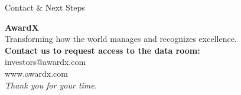 \documentclass[aspectratio=169, 10pt]{beamer}
\begin{document}
\begin{frame}{Contact \& Next Steps}
    \begin{center}
        \Huge \textbf{AwardX} \\
        \vspace{0.8cm}
        \Large \textcolor{CorporateSecondary}{Transforming how the world manages and recognizes excellence.} \\
        \vspace{1cm}
        \normalsize 
        \textbf{Contact us to request access to the data room:} \\
        \vspace{0.2cm}
        investors@awardx.com \\
        www.awardx.com \\
        \vspace{0.5cm}
        \textit{Thank you for your time.}
    \end{center}
\end{frame}
\end{document}
